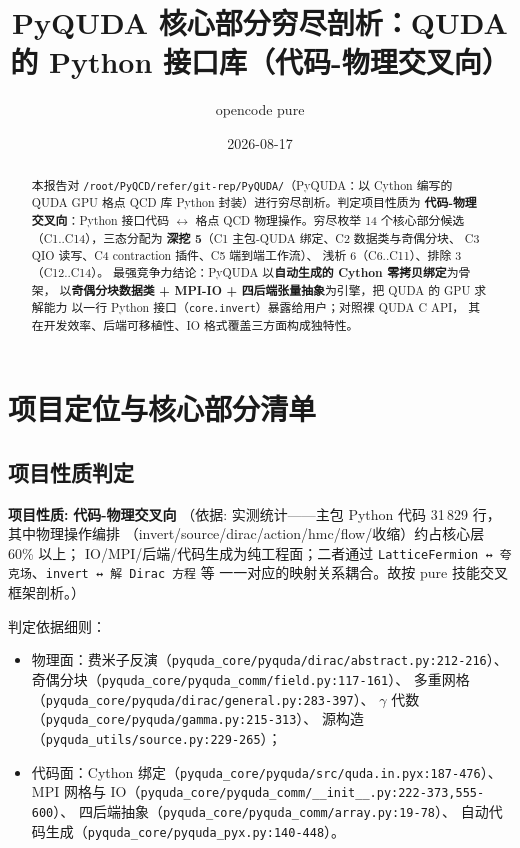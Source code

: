 \documentclass[UTF8]{ctexart}
\title{PyQUDA 核心部分穷尽剖析：\newline QUDA 的 Python 接口库（代码-物理交叉向）}
\author{opencode pure}
\date{2026-08-17}
\begin{document}
\maketitle

\begin{abstract}
本报告对 \texttt{/root/PyQCD/refer/git-rep/PyQUDA/}（PyQUDA：以 Cython 编写的 QUDA GPU
格点 QCD 库 Python 封装）进行穷尽剖析。判定项目性质为
\textcolor{phys}{\textbf{代码-物理交叉向}}：Python 接口代码 $\leftrightarrow$ 格点 QCD
物理操作。穷尽枚举 14 个核心部分候选（C1..C14），三态分配为
\textcolor{algo}{\textbf{深挖 5}}（C1 主包-QUDA 绑定、C2 数据类与奇偶分块、
C3 QIO 读写、C4 contraction 插件、C5 端到端工作流）、
\textcolor{phys}{浅析 6}（C6..C11）、\textcolor{warn}{排除 3}（C12..C14）。
最强竞争力结论：PyQUDA 以\textbf{自动生成的 Cython 零拷贝绑定}为骨架，
以\textbf{奇偶分块数据类 + MPI-IO + 四后端张量抽象}为引擎，把 QUDA 的 GPU 求解能力
以一行 Python 接口（\texttt{core.invert}）暴露给用户；对照裸 QUDA C API，
其在开发效率、后端可移植性、IO 格式覆盖三方面构成独特性。
\end{abstract}

\tableofcontents

\section{项目定位与核心部分清单}
\subsection{项目性质判定}
\begin{keybox}
\textbf{项目性质:} \textcolor{phys}{\textbf{代码-物理交叉向}}
（依据: 实测统计——主包 Python 代码 31\,829 行，其中物理操作编排
（invert/source/dirac/action/hmc/flow/收缩）约占核心层 60\% 以上；
IO/MPI/后端/代码生成为纯工程面；二者通过
\texttt{LatticeFermion ↔ 夸克场}、\texttt{invert ↔ 解 Dirac 方程} 等
一一对应的映射关系耦合。故按 pure 技能交叉框架剖析。）
\end{keybox}
判定依据细则：
\begin{itemize}
  \item \textcolor{phys}{物理面}：费米子反演（\texttt{\nolinkurl{pyquda_core/pyquda/dirac/abstract.py:212-216}}）、
        奇偶分块（\texttt{\nolinkurl{pyquda_core/pyquda_comm/field.py:117-161}}）、
        多重网格（\texttt{\nolinkurl{pyquda_core/pyquda/dirac/general.py:283-397}}）、
        $\gamma$ 代数（\texttt{\nolinkurl{pyquda_core/pyquda/gamma.py:215-313}}）、
        源构造（\texttt{\nolinkurl{pyquda_utils/source.py:229-265}}）；
  \item \textcolor{algo}{代码面}：Cython 绑定（\texttt{\nolinkurl{pyquda_core/pyquda/src/quda.in.pyx:187-476}}）、
        MPI 网格与 IO（\texttt{\nolinkurl{pyquda_core/pyquda_comm/__init__.py:222-373,555-600}}）、
        四后端抽象（\texttt{\nolinkurl{pyquda_core/pyquda_comm/array.py:19-78}}）、
        自动代码生成（\texttt{\nolinkurl{pyquda_core/pyquda_pyx.py:140-448}}）。
\end{itemize}
\end{document}
